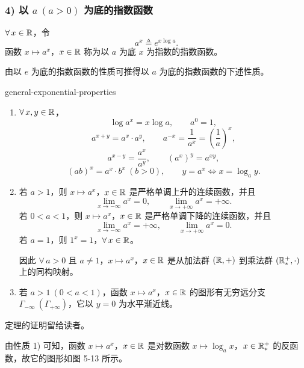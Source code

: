 \subsubsection*{4) 以 \(a\ (a>0)\) 为底的指数函数}

\begin{mydef*}{}

	\(\forall\,x\in\mathbb{R}\)，令
	\[
	a^x\triangleq e^{x\log a}.
	\]
	函数 \(x\longmapsto a^x\)，\(x\in\mathbb{R}\) 称为以 \(a\) 为底 \(x\) 为指数的指数函数。

\end{mydef*}

由以 \(e\) 为底的指数函数的性质可推得以 \(a\) 为底的指数函数的下述性质。

\begin{mythm}{}{general-exponential-properties}

	\begin{enumerate}[label=\arabic*)]
		\item \(\forall\,x,y\in\mathbb{R}\)，
		\[
		\log a^x=x\log a,\qquad a^0=1,
		\]
		\[
		a^{x+y}=a^x\cdot a^y,\qquad a^{-x}=\frac1{a^x}=\left(\frac1a\right)^x,
		\]
		\[
		a^{x-y}=\frac{a^x}{a^y},\qquad (a^x)^y=a^{xy},
		\]
		\[
		(ab)^x=a^x\cdot b^x\ (b>0),\qquad y=a^x\Longleftrightarrow x=\log_a y.
		\]

		\item 若 \(a>1\)，则 \(x\longmapsto a^x\)，\(x\in\mathbb{R}\) 是严格单调上升的连续函数，并且
		\[
		\lim_{x\to-\infty}a^x=0,\qquad\lim_{x\to+\infty}a^x=+\infty.
		\]
		若 \(0<a<1\)，则 \(x\longmapsto a^x\)，\(x\in\mathbb{R}\) 是严格单调下降的连续函数，并且
		\[
		\lim_{x\to-\infty}a^x=+\infty,\qquad\lim_{x\to+\infty}a^x=0.
		\]
		若 \(a=1\)，则 \(1^x=1\)，\(\forall\,x\in\mathbb{R}\)。

		因此 \(\forall\,a>0\) 且 \(a\neq1\)，\(x\longmapsto a^x\)，\(x\in\mathbb{R}\) 是从加法群 \((\mathbb{R},+)\) 到乘法群 \((\mathbb{R}_*^+,\cdot)\) 上的同构映射。

		\item 若 \(a>1\ (0<a<1)\)，函数 \(x\longmapsto a^x\)，\(x\in\mathbb{R}\) 的图形有无穷远分支 \(\Gamma_{-\infty}\ (\Gamma_{+\infty})\)，它以 \(y=0\) 为水平渐近线。
	\end{enumerate}

\end{mythm}

定理的证明留给读者。

由性质 1) 可知，函数 \(x\longmapsto a^x\)，\(x\in\mathbb{R}\) 是对数函数 \(x\longmapsto\log_a x\)，\(x\in\mathbb{R}_*^+\) 的反函数，故它的图形如图 5-13 所示。

